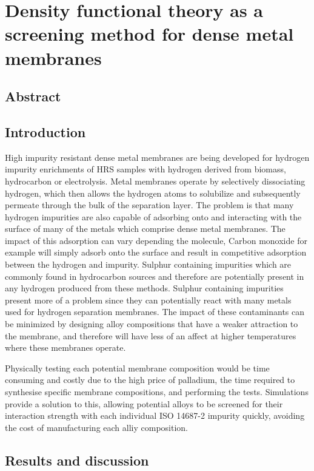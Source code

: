 \chapter{Density functional theory as a screening method for dense metal membranes}

\section{Abstract}

\section{Introduction}
High impurity resistant dense metal membranes are being developed for hydrogen impurity enrichments of HRS samples with hydrogen derived from biomass, hydrocarbon or electrolysis. Metal membranes operate by selectively dissociating hydrogen, which then allows the hydrogen atoms to solubilize and subsequently permeate through the bulk of the separation layer. The problem is that many hydrogen impurities are also capable of adsorbing onto and interacting with the surface of many of the metals which comprise dense metal membranes. The impact of this adsorption can vary depending the molecule, Carbon monoxide for example will simply adsorb onto the surface and result in competitive adsorption between the hydrogen and impurity. Sulphur containing impurities which are commonly found in hydrocarbon sources and therefore are potentially present in any hydrogen produced from these methods. Sulphur containing impurities present more of a problem since they can potentially react with many metals used for hydrogen separation membranes. The impact of these contaminants can be minimized by designing alloy compositions that have a weaker attraction to the membrane, and therefore will have less of an affect at higher temperatures where these membranes operate.

Physically testing each potential membrane composition would be time consuming and costly due to the high price of palladium, the time required to synthesise specific membrane compositions, and performing the tests. Simulations provide a solution to this, allowing potential alloys to be screened for their interaction strength with each individual ISO 14687-2 impurity quickly, avoiding the cost of manufacturing each alliy composition. 

\section{Results and discussion}



